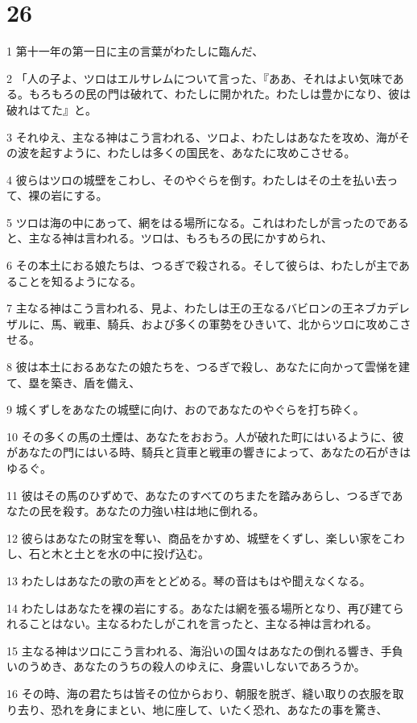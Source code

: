 \chapter{26}

\par 1 第十一年の第一日に主の言葉がわたしに臨んだ、
\par 2 「人の子よ、ツロはエルサレムについて言った、『ああ、それはよい気味である。もろもろの民の門は破れて、わたしに開かれた。わたしは豊かになり、彼は破れはてた』と。
\par 3 それゆえ、主なる神はこう言われる、ツロよ、わたしはあなたを攻め、海がその波を起すように、わたしは多くの国民を、あなたに攻めこさせる。
\par 4 彼らはツロの城壁をこわし、そのやぐらを倒す。わたしはその土を払い去って、裸の岩にする。
\par 5 ツロは海の中にあって、網をはる場所になる。これはわたしが言ったのであると、主なる神は言われる。ツロは、もろもろの民にかすめられ、
\par 6 その本土におる娘たちは、つるぎで殺される。そして彼らは、わたしが主であることを知るようになる。
\par 7 主なる神はこう言われる、見よ、わたしは王の王なるバビロンの王ネブカデレザルに、馬、戦車、騎兵、および多くの軍勢をひきいて、北からツロに攻めこさせる。
\par 8 彼は本土におるあなたの娘たちを、つるぎで殺し、あなたに向かって雲悌を建て、塁を築き、盾を備え、
\par 9 城くずしをあなたの城壁に向け、おのであなたのやぐらを打ち砕く。
\par 10 その多くの馬の土煙は、あなたをおおう。人が破れた町にはいるように、彼があなたの門にはいる時、騎兵と貨車と戦車の響きによって、あなたの石がきはゆるぐ。
\par 11 彼はその馬のひずめで、あなたのすべてのちまたを踏みあらし、つるぎであなたの民を殺す。あなたの力強い柱は地に倒れる。
\par 12 彼らはあなたの財宝を奪い、商品をかすめ、城壁をくずし、楽しい家をこわし、石と木と土とを水の中に投げ込む。
\par 13 わたしはあなたの歌の声をとどめる。琴の音はもはや聞えなくなる。
\par 14 わたしはあなたを裸の岩にする。あなたは網を張る場所となり、再び建てられることはない。主なるわたしがこれを言ったと、主なる神は言われる。
\par 15 主なる神はツロにこう言われる、海沿いの国々はあなたの倒れる響き、手負いのうめき、あなたのうちの殺人のゆえに、身震いしないであろうか。
\par 16 その時、海の君たちは皆その位からおり、朝服を脱ぎ、縫い取りの衣服を取り去り、恐れを身にまとい、地に座して、いたく恐れ、あなたの事を驚き、
